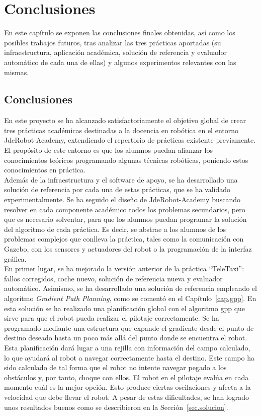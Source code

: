 \chapter{Conclusiones}\label{cap.conclusiones}
En este capítulo se exponen las conclusiones finales obtenidas, así como los posibles trabajos futuros, tras analizar las tres prácticas aportadas (su infraestructura, aplicación académica, solución de referencia y evaluador automático de cada una de ellas) y algunos experimentos relevantes con las mismas.

\section{Conclusiones}
En este proyecto se ha alcanzado satisfactoriamente el objetivo global de crear tres prácticas académicas destinadas a la docencia en robótica en el entorno JdeRobot-Academy, extendiendo el repertorio de prácticas existente previamente. El propósito de este entorno es que los alumnos puedan afianzar los conocimientos teóricos programando algunas técnicas robóticas, poniendo estos conocimientos en práctica.\\

Además de la infraestructura y el software de apoyo, se ha desarrollado una solución de referencia por cada una de estas prácticas, que se ha validado experimentalmente. Se ha seguido el diseño de JdeRobot-Academy buscando resolver en cada componente académico todos los problemas secundarios, pero que es necesario solventar, para que los alumnos puedan programar la solución del algoritmo de cada práctica. Es decir, se abstrae a los alumnos de los problemas complejos que conlleva la práctica, tales como la comunicación con Gazebo, con los sensores y actuadores del robot o la programación de la interfaz gráfica.\\

En primer lugar, se ha mejorado la versión anterior de la práctica ``TeleTaxi'': fallos corregidos, coche nuevo, solución de referencia nueva y evaluador automático. Asimismo, se ha desarrollado una solución de referencia empleando el algoritmo \textit{Gradient Path Planning}, como se comentó en el Capítulo~\ref{cap.gpp}. En esta solución se ha realizado una planificación global con el algoritmo \acrshort{gpp} que sirve para que el robot pueda realizar el pilotaje correctamente. Se ha programado mediante una estructura que expande el gradiente desde el punto de destino deseado hasta un poco más allá del punto donde se encuentra el robot. Esta planificación dará lugar a una rejilla con información del campo calculado, lo que ayudará al robot a navegar correctamente hasta el destino. Este campo ha sido calculado de tal forma que el robot no intente navegar pegado a los obstáculos y, por tanto, choque con ellos. El robot en el pilotaje evalúa en cada momento cuál es la mejor opción. Esto produce ciertas oscilaciones y afecta a la velocidad que debe llevar el robot. A pesar de estas dificultades, se han logrado unos resultados buenos como se describieron en la Sección~\ref{sec.solucion}. \\

